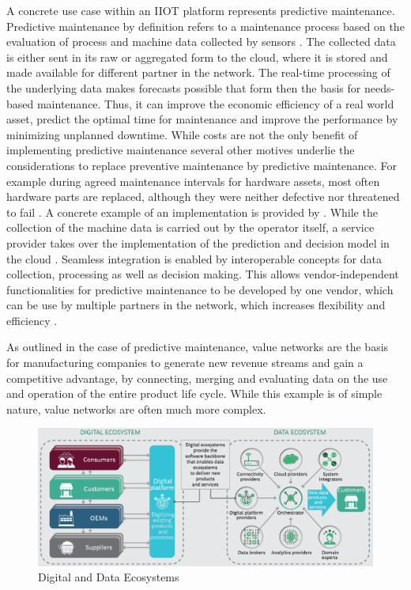 A concrete use case within an \ac{IIOT} platform represents predictive maintenance. Predictive maintenance by definition refers to a maintenance process based on the evaluation of process and machine data collected by sensors \cite[p. 1670]{Selcuk2016PredictiveTrends:}. The collected data is either sent in its raw or aggregated form to the cloud, where it is stored and made available for different partner in the network. The real-time processing of the underlying data makes forecasts possible that form then the basis for needs-based maintenance. Thus, it can improve the economic efficiency of a real world asset, predict the optimal time for maintenance and improve the performance by minimizing unplanned downtime. While costs are not the only benefit of implementing predictive maintenance several other motives underlie the considerations to replace preventive maintenance by predictive maintenance. For example during agreed maintenance intervals for hardware assets, most often hardware parts are replaced, although they were neither defective nor threatened to fail \cite[p. 1672]{Selcuk2016PredictiveTrends:}. A concrete example of an implementation is provided by \citeauthor{Cavalieri2020AShell}. While the collection of the machine data is carried out by the operator itself, a service provider takes over the implementation of the prediction and decision model in the cloud \cite[p. 11]{Cavalieri2020AShell}. Seamless integration is enabled by interoperable concepts for data collection, processing as well as decision making. This allows vendor-independent functionalities for predictive maintenance to be developed by one vendor, which can be use by multiple partners in the network, which increases flexibility and efficiency \cite[p. 9]{Cavalieri2020AShell}.

As outlined in the case of predictive maintenance, value networks are the basis for manufacturing companies to generate new revenue streams and gain a competitive advantage, by connecting, merging and evaluating data on the use and operation of the entire product life cycle. While this example is of simple nature, value networks are often much more complex.

\begin{figure}[h]
\includegraphics[scale=0.35]{content/pictures/digital_ecosystems_bcg.png}
\caption{Digital and Data Ecosystems}
\label{fig:valuenetworksi40}
\end{figure}

